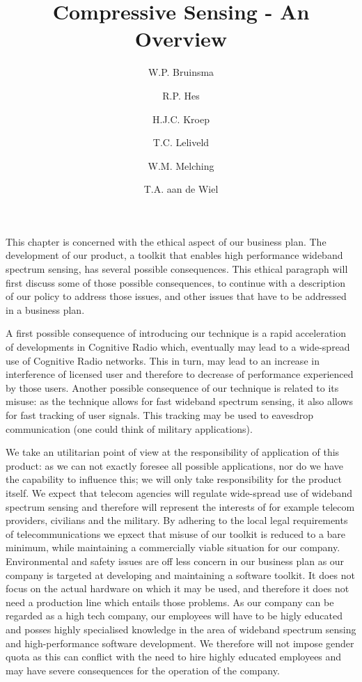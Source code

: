 \documentclass[a4paper, openany, oneside]{memoir}
\title{Compressive Sensing - An Overview}
\author{W.P. Bruinsma \and R.P. Hes \and H.J.C. Kroep \and T.C. Leliveld \and W.M. Melching \and T.A. aan de Wiel}
\begin{document}
This chapter is concerned with the ethical aspect of our business plan. The development of our product, a toolkit that enables high performance wideband spectrum sensing, has several possible consequences. This ethical paragraph will first discuss some of those possible consequences, to continue with a description of our policy to address  those issues, and other issues that have to be addressed in a business plan. 

A first possible consequence of introducing our technique is a rapid acceleration of developments in Cognitive Radio which, eventually
may lead to a wide-spread use of Cognitive Radio networks. This in turn, may lead to an increase in interference of licensed user and therefore to decrease of performance experienced by those users.  Another possible consequence of our technique is related to its misuse:
as the technique allows for fast wideband spectrum sensing, it also allows for fast tracking of user signals. This tracking may be used to eavesdrop communication (one could think of military applications). 

We take an utilitarian point of view at the responsibility of application of this product: as we can not exactly foresee all possible applications, nor do we have the capability to influence this; we will only take responsibility for the product itself. We expect that telecom agencies will regulate wide-spread use of wideband spectrum sensing and therefore will represent the interests of for example telecom providers, civilians and the military. By adhering to the local legal requirements of telecommunications we epxect that misuse of our toolkit is reduced to a bare minimum, while maintaining a commercially viable situation for our company.
Environmental and safety issues are off less concern in our business plan as our company is targeted at developing and maintaining a software toolkit. It does not focus on the actual hardware on which it may be used, and therefore it does not need a production line which entails those problems. As our company can be regarded as a high tech company, our employees will have to be higly educated and posses highly specialised knowledge in the area of wideband spectrum sensing and high-performance software development. We therefore will not impose gender quota as this can conflict with the need to hire highly educated employees and may have severe consequences for the operation of the company. 
\end{document}
